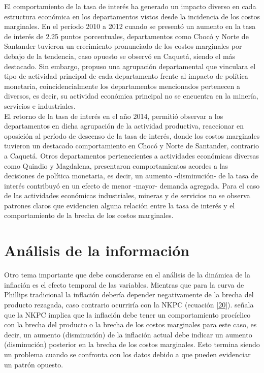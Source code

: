 El comportamiento de la tasa de interés ha generado un impacto diverso en cada estructura económica en los departamentos vistos desde la incidencia de los costos marginales. En el período 2010 a 2012 cuando se presentó un aumento en la tasa de interés de 2.25 puntos porcentuales,  departamentos como Chocó y Norte de Santander tuvieron un crecimiento pronunciado de los costos marginales por debajo de la tendencia, caso opuesto se observó en Caquetá, siendo el más destacado. Sin embargo, \cite{quintero2019impactos}  propuso una agrupación departamental que vinculara el tipo de actividad principal de cada departamento frente al impacto de política monetaria, coincidencialmente los departamentos mencionados pertenecen a diversos, es decir, su actividad económica principal no se encuentra en la minería, servicios e industriales.\\

El retorno de la tasa de interés en el año 2014, permitió observar a los departamentos en dicha agrupación de la actividad productiva, reaccionar en oposición al período de descenso de la tasa de interés, donde los costos marginales tuvieron un destacado comportamiento en Chocó y Norte de Santander, contrario a Caquetá. Otros departamentos pertenecientes a actividades económicas  diversas como Quindio y Magdalena, presentaron comportamientos acordes a las decisiones de política monetaria, es decir, un aumento -disminución- de la tasa de interés contribuyó en un efecto de menor -mayor- demanda agregada. Para el caso de las actividades económicas industriales, mineras y de servicios no se observa patrones claros que evidencien alguna relación entre la tasa de interés y el comportamiento de la brecha de los costos marginales.


\section{Análisis de la información}
Otro tema importante que debe considerarse en el análisis de la dinámica de la inflación es el efecto temporal de las variables. Mientras que para la curva de Phillips tradicional la inflación debería depender negativamente de la brecha del producto rezagada, caso contrario ocurriría con la NKPC (ecuación \eqref{20}). \cite{fuhrer1995inflation} señala que la NKPC implica que la inflación debe tener un comportamiento procíclico con la brecha del producto o la brecha de los costos marginales para este caso, es decir,  un aumento (disminución) de la inflación actual debe indicar un aumento (disminución) posterior en la brecha de los costos marginales. Esto termina siendo un problema cuando se confronta con los datos debido a que pueden evidenciar un patrón opuesto.\\

